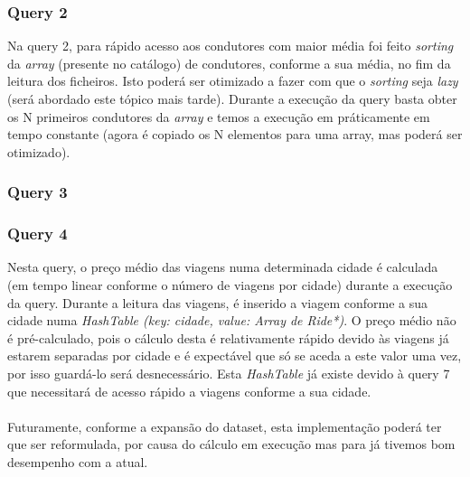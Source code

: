 \documentclass{article}
\begin{document}
        \subsubsection{Query 2}
            Na query 2, para rápido acesso aos condutores com maior média foi 
            feito \emph{sorting} da \emph{array} (presente no catálogo) de 
            condutores, conforme a sua média, no fim da leitura dos ficheiros.
            Isto poderá ser otimizado a fazer com que o \emph{sorting} seja
            \emph{lazy} (será abordado este tópico mais tarde).
            Durante a execução da query basta obter os N primeiros 
            condutores da \emph{array} e temos a execução em práticamente em
            tempo constante (agora é copiado os N elementos para uma array, mas
            poderá ser otimizado).
        \subsubsection{Query 3}
            
        \subsubsection{Query 4}
            Nesta query, o preço médio das viagens numa determinada cidade é 
            calculada (em tempo linear conforme o número de viagens por cidade)
            durante a execução da query. Durante a leitura das viagens,
            é inserido a viagem conforme a sua cidade numa 
            \emph{HashTable (key: cidade, value: Array de Ride*)}. 
            O preço médio não é pré-calculado, pois o cálculo desta é 
            relativamente rápido devido às viagens já estarem separadas por cidade
            e é expectável que só se aceda a este valor uma vez, por isso
            guardá-lo será desnecessário.
            Esta \emph{HashTable} já existe devido à query 7 que necessitará de
            acesso rápido a viagens conforme a sua cidade. 
            \\
            \\Futuramente, conforme a expansão do dataset, esta implementação 
            poderá ter que ser reformulada, por causa do cálculo em execução mas
            para já tivemos bom desempenho com a atual.
        
\end{document}
